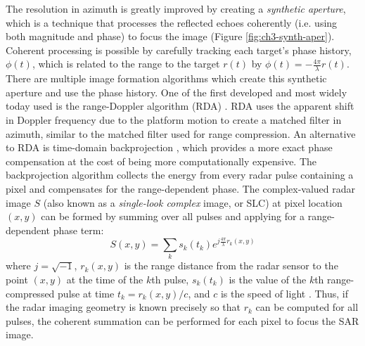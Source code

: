 The resolution in azimuth is greatly improved by creating a \emph{synthetic aperture}, which is a technique that processes the reflected echoes coherently (i.e. using both magnitude and phase) to focus the image (Figure \ref{fig:ch3-synth-aper}).
Coherent processing is possible by carefully tracking each target's phase history, $ \phi(t) $, which is related to the range to the target $r(t)$ by $\phi(t) = -\frac{4 \pi}{\lambda} r(t)$.
There are multiple image formation algorithms which create this synthetic aperture and use the phase history. One of the first developed and most widely today used is the range-Doppler algorithm (RDA) \citep{Wu1976DigitalSystemProduce, Cumming1979DigitalProcessingSeasat}. 
RDA uses the apparent shift in Doppler frequency due to the platform motion to create a matched filter in azimuth, similar to the matched filter used for range compression.
An alternative to RDA is time-domain backprojection \citep{Duersch2013BackprojectionSyntheticAperture}, which provides a more exact phase compensation at the cost of being more computationally expensive.
The backprojection algorithm collects the energy from every radar pulse containing a pixel and compensates for the range-dependent phase.
The complex-valued radar image $S$ (also known as a \emph{single-look complex} image, or SLC) at pixel location $ (x, y) $ can be formed by summing over all pulses and applying for a range-dependent phase term:
\begin{equation}
	S(x, y) = \sum_{k} s_k \left(t_k \right) e^{j \frac{4 \pi}{\lambda} r_k(x, y)}
\end{equation}
where $j = \sqrt{-1}$, $r_k(x, y)$ is the range distance from the radar sensor to the point $ (x, y) $ at the time of the $k$th pulse, $s_k(t_k)$ is the value of the $k$th range-compressed pulse at time $t_k = r_k(x, y) / c$, and $c$ is the speed of light \citep{Zebker2018InsarMissionLevel}.
Thus, if the radar imaging geometry is known precisely so that $r_k$ can be computed for all pulses, the coherent summation can be performed for each pixel to focus the SAR image.

